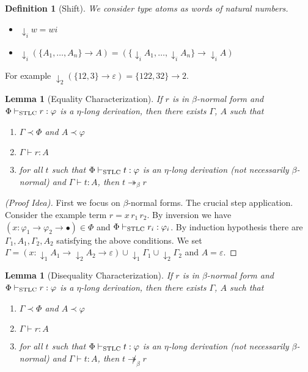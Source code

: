 \documentclass[10pt,a4paper]{article}
\theoremstyle{plain}%
\newtheorem{definition}[theorem]{Definition}
\newtheorem{lemma}[theorem]{Lemma}
\begin{document}
\begin{definition}[Shift]
We consider type atoms as words of natural numbers.
\begin{itemize}
\item ${\downarrow_i}w = wi$
\item ${\downarrow_i}(\{A_1, \ldots, A_n\} \to A) = (\{{\downarrow_i}A_1, \ldots, {\downarrow_i}A_n\} \to {\downarrow_i}A)$
\end{itemize}
\end{definition}

For example ${\downarrow_2}(\{12, 3\} \to \varepsilon) = \{122, 32\} \to 2$.

\begin{lemma}[Equality Characterization]
If $r$ is in $\beta$-normal form and $\Phi \vdash_{\textnormal{STLC}} r : \varphi$ is a $\eta$-long derivation, then there exists $\Gamma$, $A$ such that
\begin{enumerate}
\item $\Gamma \prec \Phi$ and $A \prec \varphi$
\item $\Gamma \vdash r : A$
\item for all $t$ such that $\Phi \vdash_{\textnormal{STLC}} t : \varphi$ is an $\eta$-long derivation (not necessarily $\beta$-normal) and $\Gamma \vdash t : A$, then $t \twoheadrightarrow_\beta r$
\end{enumerate}
\end{lemma}

\begin{proof}[(Proof Idea)]
First we focus on $\beta$-normal forms.
The crucial step application.
Consider the example term $r = x\,r_1\,r_2$. By inversion we have $(x : \varphi_1 \to \varphi_2 \to \bullet) \in \Phi$ and $\Phi \vdash_{\textnormal{STLC}} r_i : \varphi_i$.
By induction hypothesis there are $\Gamma_1, A_1, \Gamma_2, A_2$ satisfying the above conditions.
We set $\Gamma = (x : {\downarrow_1} A_1 \to {\downarrow_2} A_2 \to \varepsilon) \cup {\downarrow_1}\Gamma_1 \cup {\downarrow_2}\Gamma_2$
and $A = \varepsilon$.
\end{proof}

\begin{lemma}[Disequality Characterization]
If $r$ is in $\beta$-normal form and $\Phi \vdash_{\textnormal{STLC}} r : \varphi$ is a $\eta$-long derivation, then there exists $\Gamma$, $A$ such that
\begin{enumerate}
\item $\Gamma \prec \Phi$ and $A \prec \varphi$
\item $\Gamma \vdash r : A$
\item for all $t$ such that $\Phi \vdash_{\textnormal{STLC}} t : \varphi$ is an $\eta$-long derivation (not necessarily $\beta$-normal) and $\Gamma \vdash t : A$, then $t \not\twoheadrightarrow_\beta r$
\end{enumerate}
\end{lemma}
\end{document}
